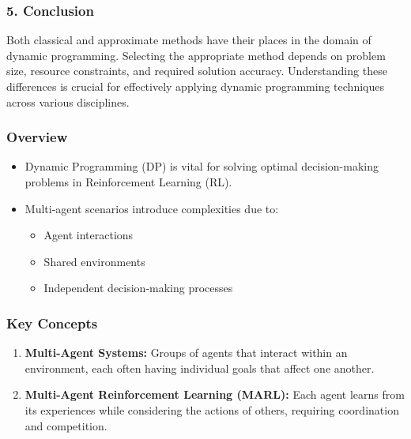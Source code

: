 \documentclass[aspectratio=169]{beamer}
\begin{document}
\begin{frame}[fragile]
  \frametitle{5. Conclusion}
  
  Both classical and approximate methods have their places in the domain of dynamic programming. Selecting the appropriate method depends on problem size, resource constraints, and required solution accuracy. Understanding these differences is crucial for effectively applying dynamic programming techniques across various disciplines.
\end{frame}

\begin{frame}[fragile]
    \frametitle{Overview}
    \begin{itemize}
        \item Dynamic Programming (DP) is vital for solving optimal decision-making problems in Reinforcement Learning (RL).
        \item Multi-agent scenarios introduce complexities due to:
        \begin{itemize}
            \item Agent interactions
            \item Shared environments
            \item Independent decision-making processes
        \end{itemize}
    \end{itemize}
\end{frame}

\begin{frame}[fragile]
    \frametitle{Key Concepts}
    \begin{enumerate}
        \item \textbf{Multi-Agent Systems:} Groups of agents that interact within an environment, each often having individual goals that affect one another.
        \item \textbf{Multi-Agent Reinforcement Learning (MARL):} Each agent learns from its experiences while considering the actions of others, requiring coordination and competition.
    \end{enumerate}
\end{frame}
\end{document}
